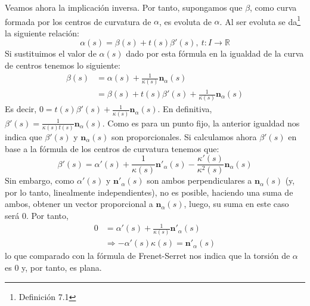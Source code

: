 Veamos ahora la implicación inversa. Por tanto, supongamos que $\beta$, como curva formada por los centros de curvatura de $\alpha$, es
evoluta de $\alpha$. Al ser evoluta se da\footnote{Definición 7.1\cite{sanjurjo}} la siguiente relación:
\[
\alpha\left( s \right) = \beta\left( s \right) + t\left( s \right)
\beta'\left( s \right),\ t: I \rightarrow \mathbb{R}
\]
Si sustituimos el valor de $\alpha\left( s \right)$ dado por esta fórmula en la
igualdad de la curva de centros tenemos lo siguiente:
\begin{align*}
    \beta\left( s \right) &= \alpha\left( s \right) + \frac{1}{\kappa\left( s
    \right)} \mathbf{n}_{\alpha}\left( s \right)\\
    &= \beta\left( s \right) + t\left( s \right) \beta'\left( s
    \right) + \frac{1}{\kappa\left( s \right)} \mathbf{n}_{\alpha}\left( s \right)
\end{align*}
Es decir, $0 = t\left( s \right)\beta'\left( s \right) +
\frac{1}{\kappa\left( s \right)} \mathbf{n}_{\alpha}\left( s \right)$. En
definitiva, $\beta'\left( s \right) = \frac{1}{\kappa\left( s \right)
t\left( s \right)} \mathbf{n}_{\alpha}\left( s \right)$. Como es para
un punto fijo, la anterior igualdad nos indica que $\beta'\left( s \right)$ y
$\mathbf{n}_{\alpha}\left( s \right)$ son proporcionales. %
Si calculamos ahora $\beta'\left( s \right)$ en base a la fórmula de los centros de curvatura
tenemos que:
\[
\beta'\left( s \right) = \alpha'\left( s \right) + \frac{1}{\kappa\left( s
\right)} \mathbf{n}'_{\alpha}\left( s \right) - \frac{\kappa'\left( s
\right)}{\kappa^2\left( s \right)} \mathbf{n}_{\alpha}\left( s \right)
\]
Sin embargo, como $\alpha'\left( s \right)$ y $\mathbf{n}'_{\alpha}\left( s
\right)$ son ambos perpendiculares a $\mathbf{n}_{\alpha}\left( s \right)$ (y,
por lo tanto, linealmente independientes), no es posible, haciendo una suma de
ambos, obtener un vector proporcional a $\mathbf{n}_{\alpha}\left( s \right)$,
luego, su suma en este caso será $0$. Por tanto,
\begin{align*}
    0 &= \alpha'\left( s \right) + \frac{1}{\kappa\left( s
\right)}\mathbf{n}'_{\alpha}\left( s \right)\\
      &\Rightarrow -\alpha'\left( s \right) \kappa\left( s \right) =
      \mathbf{n}'_{\alpha}\left( s \right)
\end{align*}
lo que comparado con la fórmula de Frenet-Serret nos indica que la torsión de
$\alpha$ es $0$ y, por tanto, es plana.
